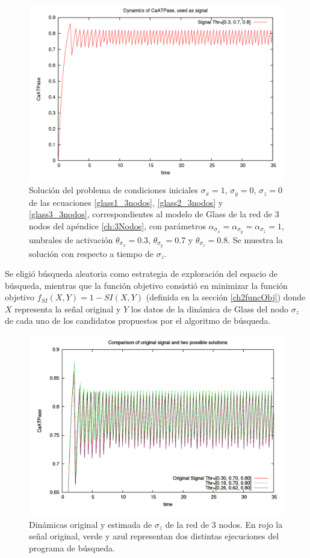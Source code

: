 \begin{figure}[hbt]
\includegraphics[width=0.9\linewidth]{gfx/original3Nodos}
\caption[Dinámica original $\sigma_z$]{Solución del problema de condiciones iniciales $\sigma_x = 1$, $\sigma_y = 0$, $\sigma_z = 0$ de las ecuaciones \ref{glass1_3nodos}, \ref{glass2_3nodos} y \ref{glass3_3nodos}, correspondientes al modelo de Glass de la red de 3 nodos del apéndice \ref{ch:3Nodos}, con parámetros $\alpha_{\sigma_x} = \alpha_{\sigma_y} = \alpha_{\sigma_z} = 1$, umbrales de activación $\theta_{\sigma_x} = 0.3$, $\theta_{\sigma_y} = 0.7$ y $\theta_{\sigma_z} = 0.8$. Se muestra la solución con respecto a tiempo de $\sigma_z$.}\label{fig:signal3nodos}
\end{figure}

Se eligió búsqueda aleatoria como estrategia de exploración del espacio de búsqueda, mientras que la función objetivo consistió en minimizar la función objetivo $f_{SI}(X,Y) = 1 -SI(X,Y)$ (definida en la sección \ref{ch2funcObj}) donde $X$ representa la señal original y $Y$ los datos de la dinámica de Glass del nodo $\sigma_z$ de cada uno de los candidatos propuestos por el algoritmo de búsqueda.

\begin{figure}[hbt]
\includegraphics[width=0.9\linewidth]{gfx/comparacion3Nodos}
\caption[Dinámicas original y estimada $\sigma_z$]{Dinámicas original y estimada de $\sigma_z$ de la red de 3 nodos. En rojo la señal original, verde y azul representan dos distintas ejecuciones del programa de búsqueda.}\label{fig:resultadoChido3Nodos}
\end{figure}

